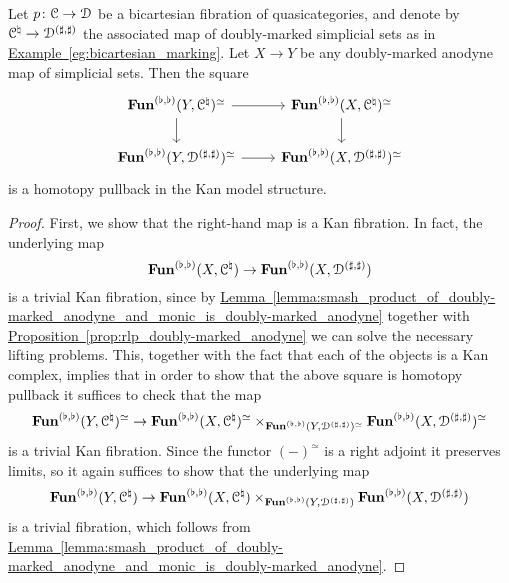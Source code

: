 \documentclass[main.tex]{subfiles}
\begin{document}
\begin{proposition}
  \label{proposition:doubly-marked_anodyne_homotopy_pullback}
  Let $p\colon \mathcal{C} \to \mathcal{D}$ be a bicartesian fibration of quasicategories, and denote by $\mathcal{C}^{\natural} \to \mathcal{D}^{(\sharp, \sharp)}$ the associated map of doubly-marked simplicial sets as in \hyperref[eg:bicartesian_marking]{Example~\ref*{eg:bicartesian_marking}}. Let $X \to Y$ be any doubly-marked anodyne map of simplicial sets. Then the square
  \begin{equation*}
    \begin{tikzcd}
      \Fun^{(\flat, \flat)}(Y, \category{C}\nat)^{\simeq}
      \arrow[r]
      \arrow[d]
      & \Fun^{(\flat, \flat)}(X, \category{C}\nat)^{\simeq}
      \arrow[d]
      \\
      \Fun^{(\flat, \flat)}(Y, \category{D}^{(\sharp, \sharp)})^{\simeq}
      \arrow[r]
      & \Fun^{(\flat, \flat)}(X, \category{D}^{(\sharp, \sharp)})^{\simeq}
    \end{tikzcd}
  \end{equation*}
  is a homotopy pullback in the Kan model structure.
\end{proposition}
\begin{proof}
  First, we show that the right-hand map is a Kan fibration. In fact, the underlying map
  \begin{equation*}
    \mathbf{Fun}^{(\flat, \flat)}(X, \mathcal{C}^{\natural}) \to \mathbf{Fun}^{(\flat, \flat)}(X, \mathcal{D}^{(\sharp, \sharp)})
  \end{equation*}
  is a trivial Kan fibration, since by \hyperref[lemma:smash_product_of_doubly-marked_anodyne_and_monic_is_doubly-marked_anodyne]{Lemma~\ref*{lemma:smash_product_of_doubly-marked_anodyne_and_monic_is_doubly-marked_anodyne}} together with \hyperref[prop:rlp_doubly-marked_anodyne]{Proposition~\ref*{prop:rlp_doubly-marked_anodyne}} we can solve the necessary lifting problems. This, together with the fact that each of the objects is a Kan complex, implies that in order to show that the above square is homotopy pullback it suffices to check that the map
  \begin{equation*}
    \mathbf{Fun}^{(\flat, \flat)}(Y, \mathcal{C}^{\natural})^{\simeq} \to \mathbf{Fun}^{(\flat, \flat)}(X, \mathcal{C}^{\natural})^{\simeq} \times_{\mathbf{Fun}^{(\flat, \flat)}(Y, \mathcal{D}^{(\sharp, \sharp)})^{\simeq}} \mathbf{Fun}^{(\flat, \flat)}(X, \mathcal{D}^{(\sharp, \sharp)})^{\simeq}
  \end{equation*}
  is a trivial Kan fibration. Since the functor $(-)^{\simeq}$ is a right adjoint it preserves limits, so it again suffices to show that the underlying map
  \begin{equation*}
    \mathbf{Fun}^{(\flat, \flat)}(Y, \mathcal{C}^{\natural}) \to \mathbf{Fun}^{(\flat, \flat)}(X, \mathcal{C}^{\natural}) \times_{\mathbf{Fun}^{(\flat, \flat)}(Y, \mathcal{D}^{(\sharp, \sharp)})} \mathbf{Fun}^{(\flat, \flat)}(X, \mathcal{D}^{(\sharp, \sharp)})
  \end{equation*}
  is a trivial fibration, which follows from \hyperref[lemma:smash_product_of_doubly-marked_anodyne_and_monic_is_doubly-marked_anodyne]{Lemma~\ref*{lemma:smash_product_of_doubly-marked_anodyne_and_monic_is_doubly-marked_anodyne}}.
\end{proof}
\end{document}
